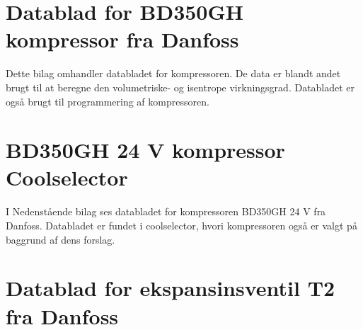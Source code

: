 \documentclass[Hovedrapport.tex]{subfiles}
\begin{document}
\newpage
\section{Datablad for BD350GH kompressor fra Danfoss}
\label{sec:bil_kom}
Dette bilag omhandler databladet for kompressoren. De data er blandt andet brugt til at beregne den volumetriske- og isentrope virkningsgrad. Databladet er også brugt til programmering af kompressoren.\\ 
\begin{minipage}{1.0\textwidth}

\end{minipage}




\newpage
\section{BD350GH 24 V kompressor Coolselector}
    \label{sec:bil_kompressor_coolpack}
I Nedenstående bilag ses databladet for kompressoren BD350GH 24 V fra Danfoss. Databladet er fundet i coolselector, hvori kompressoren også er valgt på baggrund af dens forslag.
\begin{minipage}{1.0\textwidth}

\end{minipage}


\newpage
\section{Datablad for ekspansinsventil T2 fra Danfoss}{\label{sec:bil_ventil}}
\end{document}
